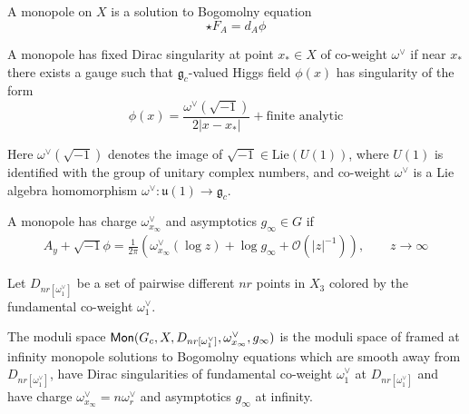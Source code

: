\documentclass[12pt,psamsfonts,reqno]{amsart}
\begin{document}
\begin{remark}
\begin{definition}
A monopole on $X$ is a solution to Bogomolny equation
  \begin{equation}
    \star F_{A} = d_{A} \phi
  \end{equation}
\end{definition}


\begin{definition}
A monopole has fixed Dirac singularity at point $x_{*} \in X$ of co-weight $\omega^{\vee}$
  if near $x_*$ there exists a gauge such that $\mathfrak{g}_{c}$-valued Higgs field $\phi(x)$ has singularity
of the form
\begin{equation}
  \phi(x) = \frac{ \omega^{\vee} (\sqrt{-1})} { 2 |x - x_{*}|} + \text{finite analytic}
\end{equation}
\end{definition}

Here $\omega^{\vee}(\sqrt{-1})$ denotes the image of $\sqrt{-1} \in \mathrm{Lie}(U(1))$,
where $U(1)$ is identified with the group of unitary complex numbers,
and co-weight $\omega^{\vee}$ is a Lie algebra homomorphism $\omega^{\vee}: \mathfrak{u}(1) \to \mathfrak{g}_{c}$.

\begin{definition}
A  monopole
has charge $\omega^{\vee}_{x_\infty}$ and asymptotics $g_{\infty} \in G$ if 
\begin{equation}
  \begin{aligned}
   A_y  +  \sqrt{-1} \phi = \frac{1}{2\pi} \left( \omega^{\vee}_{x_{\infty}}( \log z)  + \log g_{\infty} + \mathcal{O}(|z|^{-1})  \right), \qquad z \to \infty
  \end{aligned}
\end{equation}
\end{definition}

Let $D_{nr[\omega_1^{\vee}]}$ be a set of pairwise different $nr$ points in $X_3$ 
colored by the fundamental co-weight $\omega^{\vee}_{1}$. 


\begin{definition}
The moduli space $\mathsf{Mon}(G_{c}, X, D_{nr[\omega_1^{\vee}]}, \omega_{x_\infty}^{\vee},  g_{\infty})$ is the moduli space of 
framed at infinity monopole solutions to Bogomolny equations which are smooth away from $D_{nr[\omega_1^{\vee}]}$, 
have Dirac singularities of fundamental co-weight $\omega_1^{\vee}$  at $D_{nr[\omega_1^{\vee}]}$
and have charge $\omega_{x_\infty}^{\vee} = n\omega_{r}^{\vee}$ and asymptotics $g_\infty$ at infinity. 
\end{definition}




\end{remark}
\end{document}
